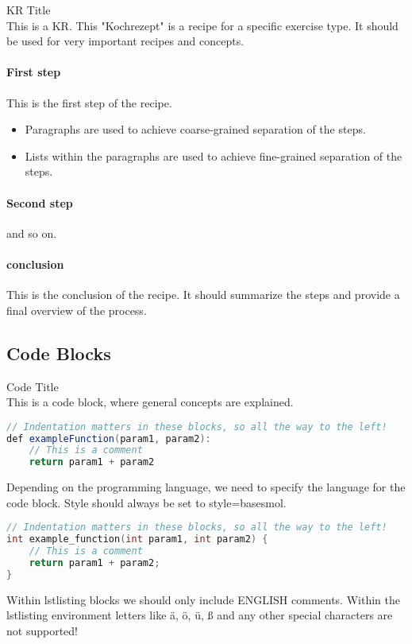 \begin{KR}{KR Title}\\
    This is a KR. This "Kochrezept" is a recipe for a specific exercise type. It should be used for very important recipes and concepts.
    \paragraph{First step}
    This is the first step of the recipe.
    \begin{itemize}
        \item Paragraphs are used to achieve coarse-grained separation of the steps.
        \item Lists within the paragraphs are used to achieve fine-grained separation of the steps.
    \end{itemize}
    \paragraph{Second step}
    and so on.
    \paragraph{conclusion}
    This is the conclusion of the recipe. It should summarize the steps and provide a final overview of the process.
\end{KR} 

\raggedcolumns
\columnbreak

\subsection{Code Blocks}

\begin{code}{Code Title}\\
    This is a code block, where general concepts are explained.
\begin{lstlisting}[language=Java, style=basesmol]
// Indentation matters in these blocks, so all the way to the left!
def exampleFunction(param1, param2):
    // This is a comment
    return param1 + param2
\end{lstlisting}

    Depending on the programming language, we need to specify the language for the code block. Style should always be set to style=basesmol.

\begin{lstlisting}[language=C, style=basesmol]
// Indentation matters in these blocks, so all the way to the left!
int example_function(int param1, int param2) {
    // This is a comment
    return param1 + param2;
}
\end{lstlisting}

     Within lstlisting blocks we should only include ENGLISH comments. 
    Within the lstlisting environment letters like ä, ö, ü, ß and any other special characters are not supported!
\end{code}

